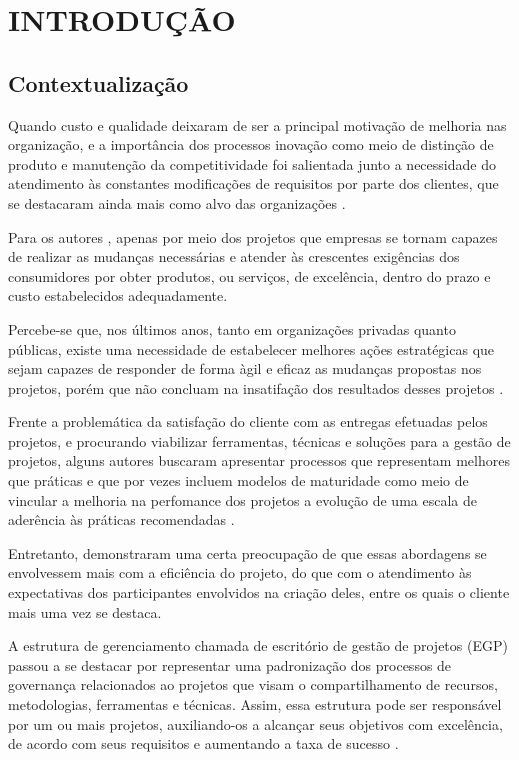 \chapter{INTRODUÇÃO}
\thispagestyle{empty}

\section{Contextualização}
Quando custo e qualidade deixaram de ser a principal motivação de melhoria nas organização, e a importância dos processos inovação como meio de distinção de produto e manutenção da competitividade foi salientada junto a necessidade do atendimento às constantes modificações de requisitos por parte dos clientes, que se destacaram ainda mais como alvo das organizações \cite{atkinson2012global}.

Para os autores , apenas por meio dos projetos que empresas se tornam capazes de realizar as mudanças necessárias e atender às crescentes exigências dos consumidores por obter produtos, ou serviços, de excelência, dentro do prazo e custo estabelecidos adequadamente.

Percebe-se que, nos últimos anos, tanto em organizações privadas quanto públicas, existe uma necessidade de estabelecer melhores ações estratégicas que sejam capazes de responder de forma àgil e eficaz as mudanças propostas nos projetos, porém que não concluam na insatifação dos resultados desses projetos \cite{de2008construindo}.

Frente a problemática da satisfação do cliente com as entregas efetuadas pelos projetos, e procurando viabilizar ferramentas, técnicas e soluções para a gestão de projetos, alguns autores buscaram apresentar processos que representam melhores que práticas e que por vezes incluem modelos de maturidade como meio de vincular a melhoria na perfomance dos projetos a evolução de uma escala de aderência às práticas recomendadas \cite{kerzner2013project, pmiguide2014, prado2006mmgp}.

Entretanto,  demonstraram uma certa preocupação de que essas abordagens se envolvessem mais com a eficiência do projeto, do que com o atendimento às expectativas dos participantes envolvidos na criação deles, entre os quais o cliente mais uma vez se destaca.

A estrutura de gerenciamento chamada de escritório de gestão de projetos (EGP) passou a se destacar por representar uma padronização dos processos de governança relacionados ao projetos que visam o compartilhamento de recursos, metodologias, ferramentas e técnicas. Assim, essa estrutura pode ser responsável por um ou mais projetos, auxiliando-os a alcançar seus objetivos com excelência, de acordo com seus requisitos e aumentando a taxa de sucesso \cite{pmiguide2014}.

